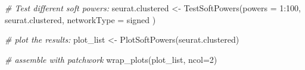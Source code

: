 \documentclass[
  letterpaper,
  DIV=11,
  numbers=noendperiod]{scrartcl}
\newenvironment{Shaded}{\begin{snugshade}}{\end{snugshade}}
\newcommand{\AttributeTok}[1]{\textcolor[rgb]{0.49,0.56,0.16}{#1}}
\newcommand{\CommentTok}[1]{\textcolor[rgb]{0.38,0.63,0.69}{\textit{#1}}}
\newcommand{\DecValTok}[1]{\textcolor[rgb]{0.25,0.63,0.44}{#1}}
\newcommand{\FunctionTok}[1]{\textcolor[rgb]{0.02,0.16,0.49}{#1}}
\newcommand{\NormalTok}[1]{\textcolor[rgb]{0.00,0.44,0.13}{#1}}
\newcommand{\OtherTok}[1]{\textcolor[rgb]{0.00,0.44,0.13}{#1}}
\newcommand{\SpecialCharTok}[1]{\textcolor[rgb]{0.25,0.44,0.63}{#1}}
\newcommand{\StringTok}[1]{\textcolor[rgb]{0.25,0.44,0.63}{#1}}
\begin{document}
\begin{Shaded}
\begin{Highlighting}[]
\CommentTok{\# Test different soft powers:}
\NormalTok{seurat.clustered }\OtherTok{\textless{}{-}} \FunctionTok{TestSoftPowers}\NormalTok{(}\AttributeTok{powers =} \DecValTok{1}\SpecialCharTok{:}\DecValTok{100}\NormalTok{,}
\NormalTok{  seurat.clustered,}
  \AttributeTok{networkType =} \StringTok{\textquotesingle{}signed\textquotesingle{}}
\NormalTok{)}

\CommentTok{\# plot the results:}
\NormalTok{plot\_list }\OtherTok{\textless{}{-}} \FunctionTok{PlotSoftPowers}\NormalTok{(seurat.clustered)}

\CommentTok{\# assemble with patchwork}
\FunctionTok{wrap\_plots}\NormalTok{(plot\_list, }\AttributeTok{ncol=}\DecValTok{2}\NormalTok{)}
\end{Highlighting}
\end{Shaded}
\end{document}
